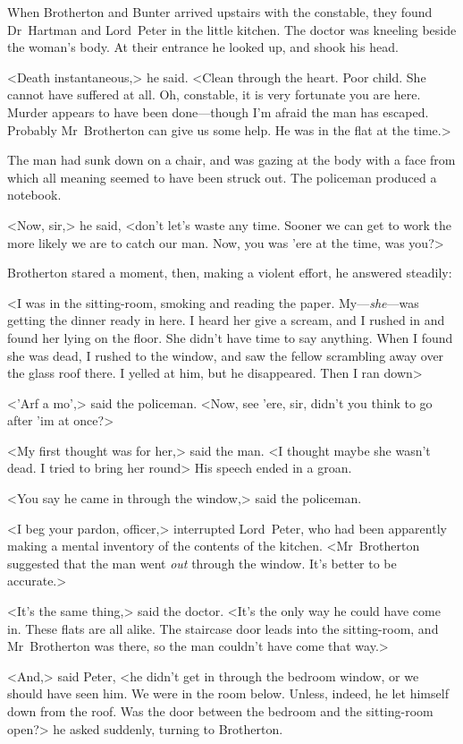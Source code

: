 When Brotherton and Bunter arrived upstairs with the constable, they found Dr~Hartman and Lord~Peter in the little kitchen. The doctor was kneeling beside the woman's body. At their entrance he looked up, and shook his head.

<Death instantaneous,> he said. <Clean through the heart. Poor child. She cannot have suffered at all. Oh, constable, it is very fortunate you are here. Murder appears to have been done—though I'm afraid the man has escaped. Probably Mr~Brotherton can give us some help. He was in the flat at the time.>

The man had sunk down on a chair, and was gazing at the body with a face from which all meaning seemed to have been struck out. The policeman produced a notebook.

<Now, sir,> he said, <don't let's waste any time. Sooner we can get to work the more likely we are to catch our man. Now, you was 'ere at the time, was you?>

Brotherton stared a moment, then, making a violent effort, he answered steadily:

<I was in the sitting-room, smoking and reading the paper. My—\textit{she}—was getting the dinner ready in here. I heard her give a scream, and I rushed in and found her lying on the floor. She didn't have time to say anything. When I found she was dead, I rushed to the window, and saw the fellow scrambling away over the glass roof there. I yelled at him, but he disappeared. Then I ran down\longdash>

<'Arf a mo',> said the policeman. <Now, see 'ere, sir, didn't you think to go after 'im at once?>

<My first thought was for her,> said the man. <I thought maybe she wasn't dead. I tried to bring her round\longdash> His speech ended in a groan.

<You say he came in through the window,> said the policeman.

<I beg your pardon, officer,> interrupted Lord~Peter, who had been apparently making a mental inventory of the contents of the kitchen. <Mr~Brotherton suggested that the man went \textit{out} through the window. It's better to be accurate.>

<It's the same thing,> said the doctor. <It's the only way he could have come in. These flats are all alike. The staircase door leads into the sitting-room, and Mr~Brotherton was there, so the man couldn't have come that way.>

<And,> said Peter, <he didn't get in through the bedroom window, or we should have seen him. We were in the room below. Unless, indeed, he let himself down from the roof. Was the door between the bedroom and the sitting-room open?> he asked suddenly, turning to Brotherton.

